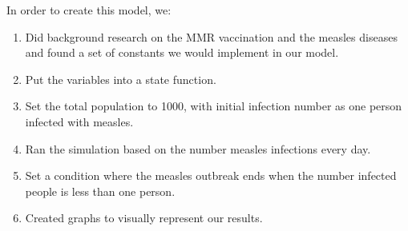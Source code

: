 \documentclass[11pt]{article}
\providecommand{\tightlist}{%
      \setlength{\itemsep}{0pt}\setlength{\parskip}{0pt}}
\begin{document}
In order to create this model, we:

\begin{enumerate}
\def\labelenumi{\arabic{enumi}.}
\tightlist
\item
  Did background research on the MMR vaccination and the measles
  diseases and found a set of constants we would implement in our model.
\item
  Put the variables into a state function.
\item
  Set the total population to 1000, with initial infection number as one
  person infected with measles.
\item
  Ran the simulation based on the number measles infections every day.
\item
  Set a condition where the measles outbreak ends when the number
  infected people is less than one person.
\item
  Created graphs to visually represent our results.
\end{enumerate}
\end{document}
